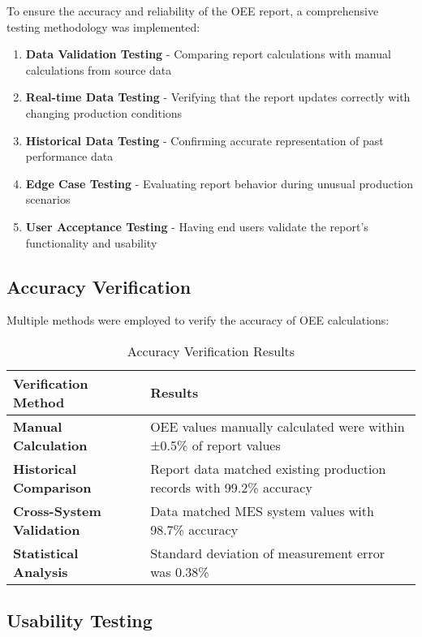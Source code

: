 \documentclass[11pt,a4paper]{article}
\begin{document}
To ensure the accuracy and reliability of the OEE report, a comprehensive testing methodology was implemented:

\begin{enumerate}
    \item \textbf{Data Validation Testing} - Comparing report calculations with manual calculations from source data
    \item \textbf{Real-time Data Testing} - Verifying that the report updates correctly with changing production conditions
    \item \textbf{Historical Data Testing} - Confirming accurate representation of past performance data
    \item \textbf{Edge Case Testing} - Evaluating report behavior during unusual production scenarios
    \item \textbf{User Acceptance Testing} - Having end users validate the report's functionality and usability
\end{enumerate}

\subsection{Accuracy Verification}

Multiple methods were employed to verify the accuracy of OEE calculations:

\begin{table}[H]
    \centering
    \begin{tabular}{>{\bfseries}p{3cm}p{9cm}}
        \toprule
        \textbf{Verification Method} & \textbf{Results} \\
        \midrule
        Manual Calculation & OEE values manually calculated were within ±0.5\% of report values \\
        \addlinespace
        Historical Comparison & Report data matched existing production records with 99.2\% accuracy \\
        \addlinespace
        Cross-System Validation & Data matched MES system values with 98.7\% accuracy \\
        \addlinespace
        Statistical Analysis & Standard deviation of measurement error was 0.38\% \\
        \bottomrule
    \end{tabular}
    \caption{Accuracy Verification Results}
    \label{tab:accuracy}
\end{table}

\subsection{Usability Testing}
\end{document}
